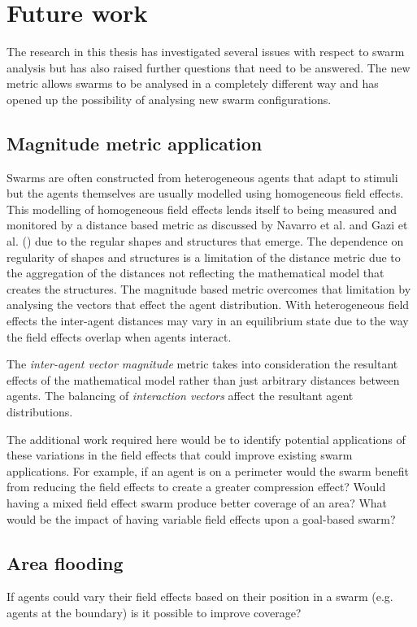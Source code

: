 \section{Future work}\label{additional:MoreWork}
The research in this thesis has investigated several issues with respect to swarm analysis but has also raised further questions that need to be answered. The new metric allows swarms to be analysed in a completely different way and has opened up the possibility of analysing new swarm configurations.

\subsection{Magnitude metric application}\label{additional:fieldsWork}
Swarms are often constructed from heterogeneous agents that adapt to stimuli but the agents themselves are usually modelled using homogeneous field effects. This modelling of homogeneous field effects lends itself to being measured and monitored by a distance based metric as discussed by Navarro et al. \cite{NIM:09} and Gazi et al. (\cite{SALGVPJ:08, VG:05, GP:02, GP:04, GP:04a, GP:05, GP:11}) due to the regular shapes and structures that emerge. The dependence on regularity of shapes and structures is a limitation of the distance metric due to the aggregation of the distances not reflecting the mathematical model that creates the structures. The magnitude based metric overcomes that limitation by analysing the vectors that effect the agent distribution. With heterogeneous field effects the inter-agent distances may vary in an equilibrium state due to the way the field effects overlap when agents interact. 

The \textit{inter-agent vector magnitude} metric takes into consideration the resultant effects of the mathematical model rather than just arbitrary distances between agents. The balancing of \textit{interaction vectors} affect the resultant agent distributions.

The additional work required here would be to identify potential applications of these variations in the field effects that could improve existing swarm applications. For example, if an agent is on a perimeter would the swarm benefit from reducing the field effects to create a greater compression effect? Would having a mixed field effect swarm produce better coverage of an area? What would be the impact of having variable field effects upon a goal-based swarm?

\subsection{Area flooding}
If agents could vary their field effects based on their position in a swarm (e.g. agents at the boundary) is it possible to improve coverage?

